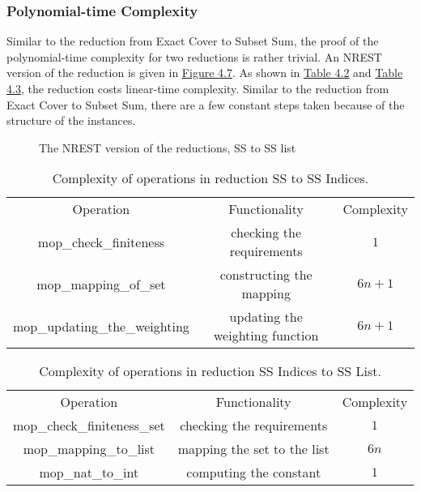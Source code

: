 \subsubsection*{Polynomial-time Complexity}
Similar to the reduction from Exact Cover to Subset Sum, the proof of the polynomial-time complexity for two reductions 
is rather trivial. An NREST version of the reduction is given in \hyperref[fig:4.7]{Figure 4.7}.
As shown in \hyperref[table:4.2]{Table 4.2} and \hyperref[table:4.3]{Table 4.3}, the reduction 
costs linear-time complexity. Similar to the reduction from Exact Cover to Subset Sum, there are a few 
constant steps taken because of the structure of the instances.
\begin{figure}[!h]
\caption{The NREST version of the reductions, SS to SS list}
\label{fig:4.7}
\end{figure}
\begin{table}[!h]
    \centering 
    \begin{tabular}{| c | c | c |}
        \hline 
        Operation & Functionality & Complexity \\ 
        \hhline{|=|=|=|}
        mop\_check\_finiteness & checking the requirements & $1$ \\ 
        \hline 
        mop\_mapping\_of\_set & constructing the mapping & $6n + 1$ \\ 
        \hline 
        mop\_updating\_the\_weighting & updating the weighting function & $6n + 1$ \\ 
        \hline 
    \end{tabular}
    \caption{Complexity of operations in reduction SS to SS Indices.}
    \label{table:4.2}
\end{table}
\begin{table}[!h]
    \centering 
    \begin{tabular}{| c | c | c |}
        \hline 
        Operation & Functionality & Complexity \\ 
        \hhline{|=|=|=|}
        mop\_check\_finiteness\_set & checking the requirements & $1$ \\ 
        \hline 
        mop\_mapping\_to\_list & mapping the set to the list & $6n$ \\ 
        \hline 
        mop\_nat\_to\_int & computing the constant & $1$ \\ 
        \hline 
    \end{tabular}
    \caption{Complexity of operations in reduction SS Indices to SS List.}
    \label{table:4.3}
\end{table}


